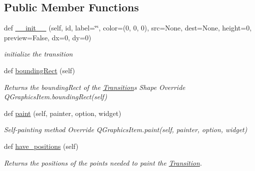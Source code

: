 \subsection*{Public Member Functions}
\begin{DoxyCompactItemize}
\item 
def \mbox{\hyperlink{classTransition_1_1Transition_a1c2076f482b63a95950805cf8210bca2}{\+\_\+\+\_\+init\+\_\+\+\_\+}} (self, id, label=\char`\"{}\char`\"{}, color=(0, 0, 0), src=None, dest=None, height=0, preview=False, dx=0, dy=0)
\begin{DoxyCompactList}\small\item\em initialize the transition   \end{DoxyCompactList}\item 
\mbox{\label{classTransition_1_1Transition_aaac0ceb423d9fd273e4f0d0593a17b22}} 
def \mbox{\hyperlink{classTransition_1_1Transition_aaac0ceb423d9fd273e4f0d0593a17b22}{bounding\+Rect}} (self)
\begin{DoxyCompactList}\small\item\em Returns the bounding\+Rect of the \mbox{\hyperlink{classTransition_1_1Transition}{Transition}}\textquotesingle{}s Shape Override Q\+Graphics\+Item.\+bounding\+Rect(self) \end{DoxyCompactList}\item 
\mbox{\label{classTransition_1_1Transition_a802e898b6f1a32cc5730b1f833e51624}} 
def \mbox{\hyperlink{classTransition_1_1Transition_a802e898b6f1a32cc5730b1f833e51624}{paint}} (self, painter, option, widget)
\begin{DoxyCompactList}\small\item\em Self-\/painting method Override Q\+Graphics\+Item.\+paint(self, painter, option, widget) \end{DoxyCompactList}\item 
\mbox{\label{classTransition_1_1Transition_af1b415678c243ee65b437661d2e63bd4}} 
def \mbox{\hyperlink{classTransition_1_1Transition_af1b415678c243ee65b437661d2e63bd4}{have\+\_\+positions}} (self)
\begin{DoxyCompactList}\small\item\em Returns the positions of the points needed to paint the \mbox{\hyperlink{classTransition_1_1Transition}{Transition}}. \end{DoxyCompactList}\item 

\end{DoxyCompactItemize}
